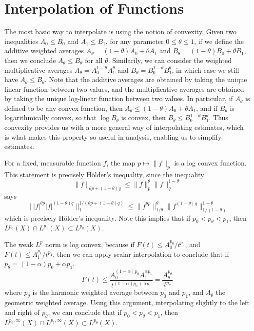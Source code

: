 \section{Interpolation of Functions}

The most basic way to interpolate is using the notion of convexity. Given two inequalities $A_0 \leq B_0$ and $A_1 \leq B_1$, for any parameter $0 \leq \theta \leq 1$, if we define the additive weighted averages $A_\theta = (1 - \theta) A_0 + \theta A_1$ and $B_\theta = (1 - \theta) B_0 + \theta B_1$, then we conclude $A_\theta \leq B_\theta$ for all $\theta$. Similarily, we can consider the weighted multiplicative averages $A_\theta = A_0^{1 - \theta} A_1^\theta$ and $B_\theta = B_0^{1 - \theta}B_1^\theta$, in which case we still have $A_\theta \leq B_\theta$. Note that the additive averages are obtained by taking the unique linear function between two values, and the multiplicative averages are obtained by taking the unique log-linear function between two values. In particular, if $A_\theta$ is defined to be any convex function, then $A_\theta \leq (1 - \theta) A_0 + \theta A_1$, and if $B_\theta$ is logarithmically convex, so that $\log B_\theta$ is convex, then $B_\theta \leq B_0^{1 - \theta} B_1^\theta$. Thus convexity provides us with a more general way of interpolating estimates, which is what makes this property so useful in analysis, enabling us to simplify estimates.

\begin{example}
    For a fixed, measurable function $f$, the map $p \mapsto \| f \|_p$ is a log convex function. This statement is precisely H\"{o}lder's inequality, since the inequality
    \[ \| f \|_{\theta p + (1 - \theta) q} \leq \| f \|_p^\theta \| f \|_{q}^{1-\theta} \]
    says
    \[ \| |f|^{\theta p} |f|^{(1 - \theta) q} \|_1^{1/(\theta p + (1 - \theta) q)} \leq \| f^{\theta p} \|_{1/\theta}^{\theta} \| f^{(1-\theta)q} \|_{1/(1-\theta)}^{1-\theta} \]
    which is precisely H\"{o}lder's inequality. Note this implies that if $p_0 < p_\theta < p_1$, then $L^{p_0}(X) \cap L^{p_1}(X) \subset L^{p_\theta}(X)$.
\end{example}

\begin{example}
    The weak $L^p$ norm is log convex, because if $F(t) \leq A_0^{p_0}/t^{p_0}$, and $F(t) \leq A_1^{p_1}/t^{p_1}$, then we can apply scalar interpolation to conclude that if $p_\theta = (1 - \alpha) p_0 + \alpha p_1$,
    \[ F(t) \leq \frac{A_0^{(1 - \alpha) p_0}A_1^{\alpha p_1}}{t^{(1 - \alpha)p_0 + \alpha p_1}} = \frac{A_\theta^{p_\theta}}{t^{p_\theta}} \]
    where $p_\theta$ is the harmonic weighted average between $p_0$ and $p_1$, and $A_\theta$ the geometric weighted average. Using this argument, interpolating slightly to the left and right of $p_\theta$, we can conclude that if $p_0 < p_\theta < p_1$, then $L^{p_0,\infty}(X) \cap L^{p_1,\infty}(X) \subset L^{p_\theta}(X)$.
\end{example}

